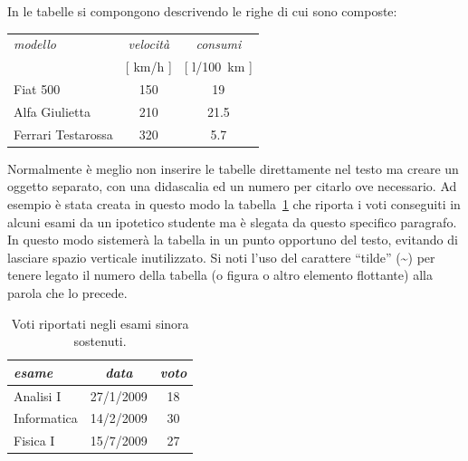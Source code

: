In \ltx le tabelle si compongono descrivendo le righe di cui sono composte:
\begin{center}
\begin{tabular}{|l|c|c|}%
\hline
\textit{modello} & \textit{velocità} & \textit{consumi} \\
                 & [ \si{km/h} ]          & [ l/\SI{100}{km} ] \\
\hline
Fiat 500 & 150 & 19 \\
Alfa Giulietta & 210 & 21.5 \\
Ferrari Testarossa & 320 & 5.7 \\
\hline
\end{tabular}
\end{center}
Normalmente è meglio non inserire le tabelle direttamente nel testo ma creare un oggetto separato, con una didascalia ed un numero per citarlo ove necessario. Ad esempio è stata creata in questo modo la tabella~\ref{tab:voti} che riporta i voti conseguiti in alcuni esami da un ipotetico studente ma è slegata da questo specifico paragrafo. In questo modo \ltx sistemerà la tabella in un punto opportuno del testo, evitando di lasciare spazio verticale inutilizzato.
Si noti l'uso del carattere ``tilde'' (\textasciitilde) per tenere legato il numero della tabella (o figura o altro elemento flottante) alla parola che lo precede.

\begin{table}[tbh] %
\begin{center}
\begin{tabular}{|l|c|c|}
\hline
\textit{esame} & \textit{data} & \textit{voto} \\
\hline
Analisi I & 27/1/2009 & 18 \\
Informatica & 14/2/2009 & 30 \\
Fisica I & 15/7/2009 & 27 \\
\hline
\end{tabular}
\caption{Voti riportati negli esami sinora sostenuti.\label{tab:voti}}
\end{center}
\end{table}

